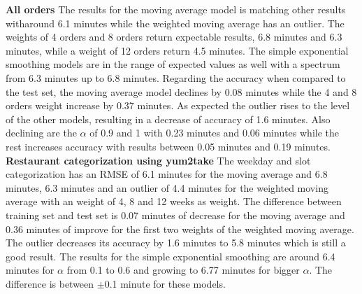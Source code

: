 \newline\newline\textbf{All orders}\newline
The results for the moving average model is matching other results witharound 6.1 minutes while the weighted moving average has an outlier. The weights of 4 orders and 8 orders return expectable results, 6.8 minutes and 6.3 minutes, while a weight of 12 orders return 4.5 minutes. The simple exponential smoothing models are in the range of expected values as well with a spectrum from 6.3 minutes up to 6.8 minutes. Regarding the accuracy when compared to the test set, the moving average model declines by 0.08 minutes while the 4 and 8 orders weight increase by 0.37 minutes. As expected the outlier rises to the level of the other models, resulting in a decrease of accuracy of 1.6 minutes. Also declining are the $\alpha$ of 0.9 and 1 with 0.23 minutes and 0.06 minutes while the rest increases accuracy with results between 0.05 minutes and 0.19 minutes.
\newline\newline\textbf{Restaurant categorization using yum2take}\newline
The weekday and slot categorization has an RMSE of 6.1 minutes for the moving average and 6.8 minutes, 6.3 minutes and an outlier of 4.4 minutes for the weighted moving average with an weight of 4, 8 and 12 weeks as weight. The difference between training set and test set is 0.07 minutes of decrease for the moving average and 0.36 minutes of improve for the first two weights of the weighted moving average. The outlier decreases its accuracy by 1.6 minutes to 5.8 minutes which is still a good result. The results for the simple exponential smoothing are around 6.4 minutes for $\alpha$ from 0.1 to 0.6 and growing to 6.77 minutes for bigger $\alpha$. The difference is between $\pm$0.1 minute for these models.
